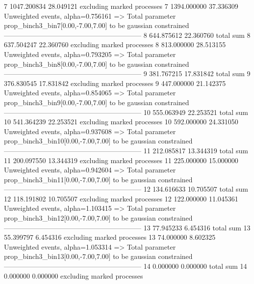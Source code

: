 7          1047.200834     28.049121       excluding marked processes    
7          1394.000000     37.336309       Unweighted events, alpha=0.756161
  => Total parameter prop_binch3_bin7[0.00,-7.00,7.00] to be gaussian constrained
------------------------------------------------------------
8          644.875612      22.360760       total sum                     
8          637.504247      22.360760       excluding marked processes    
8          813.000000      28.513155       Unweighted events, alpha=0.793205
  => Total parameter prop_binch3_bin8[0.00,-7.00,7.00] to be gaussian constrained
------------------------------------------------------------
9          381.767215      17.831842       total sum                     
9          376.830545      17.831842       excluding marked processes    
9          447.000000      21.142375       Unweighted events, alpha=0.854065
  => Total parameter prop_binch3_bin9[0.00,-7.00,7.00] to be gaussian constrained
------------------------------------------------------------
10         555.063949      22.253521       total sum                     
10         541.364239      22.253521       excluding marked processes    
10         592.000000      24.331050       Unweighted events, alpha=0.937608
  => Total parameter prop_binch3_bin10[0.00,-7.00,7.00] to be gaussian constrained
------------------------------------------------------------
11         212.085817      13.344319       total sum                     
11         200.097550      13.344319       excluding marked processes    
11         225.000000      15.000000       Unweighted events, alpha=0.942604
  => Total parameter prop_binch3_bin11[0.00,-7.00,7.00] to be gaussian constrained
------------------------------------------------------------
12         134.616633      10.705507       total sum                     
12         118.191802      10.705507       excluding marked processes    
12         122.000000      11.045361       Unweighted events, alpha=1.103415
  => Total parameter prop_binch3_bin12[0.00,-7.00,7.00] to be gaussian constrained
------------------------------------------------------------
13         77.945233       6.454316        total sum                     
13         55.399797       6.454316        excluding marked processes    
13         74.000000       8.602325        Unweighted events, alpha=1.053314
  => Total parameter prop_binch3_bin13[0.00,-7.00,7.00] to be gaussian constrained
------------------------------------------------------------
14         0.000000        0.000000        total sum                     
14         0.000000        0.000000        excluding marked processes    

